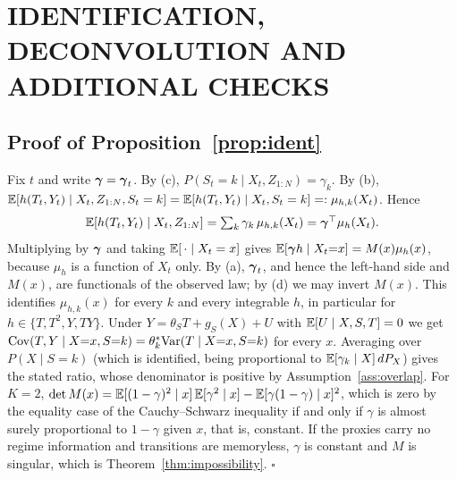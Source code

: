 \section{IDENTIFICATION, DECONVOLUTION AND ADDITIONAL CHECKS}
\label{app:ident}

\subsection{Proof of Proposition~\ref{prop:ident}}
Fix $t$ and write $\boldsymbol{\gamma}=\boldsymbol{\gamma}_t$. By (c), $P(S_t=k\mid X_t,Z_{1:N})=\gamma_k$. By (b), $\mathbb{E}[h(T_t,Y_t)\mid X_t,Z_{1:N},S_t=k]=\mathbb{E}[h(T_t,Y_t)\mid X_t,S_t=k]=:\mu_{h,k}(X_t)$. Hence
\[
\mathbb{E}[h(T_t,Y_t)\mid X_t,Z_{1:N}]=\textstyle\sum_k\gamma_k\,\mu_{h,k}(X_t)=\boldsymbol{\gamma}^\top\mu_h(X_t).
\]
Multiplying by $\boldsymbol{\gamma}$ and taking $\mathbb{E}[\,\cdot\mid X_t=x]$ gives $\mathbb{E}[\boldsymbol{\gamma} h\mid X_t{=}x]=M(x)\mu_h(x)$, because $\mu_h$ is a function of $X_t$ only. By (a), $\boldsymbol{\gamma}_t$, and hence the left-hand side and $M(x)$, are functionals of the observed law; by (d) we may invert $M(x)$. This identifies $\mu_{h,k}(x)$ for every $k$ and every integrable $h$, in particular for $h\in\{T,T^2,Y,TY\}$. Under $Y=\theta_ST+g_S(X)+U$ with $\mathbb{E}[U\mid X,S,T]=0$ we get $\mathrm{Cov}(T,Y\mid X{=}x,S{=}k)=\theta_k^*\mathrm{Var}(T\mid X{=}x,S{=}k)$ for every $x$. Averaging over $P(X\mid S{=}k)$ (which is identified, being proportional to $\mathbb{E}[\gamma_k\mid X]\,dP_X$) gives the stated ratio, whose denominator is positive by Assumption~\ref{ass:overlap}. For $K=2$, $\det M(x)=\mathbb{E}[(1-\gamma)^2\mid x]\,\mathbb{E}[\gamma^2\mid x]-\mathbb{E}[\gamma(1-\gamma)\mid x]^2$, which is zero by the equality case of the Cauchy--Schwarz inequality if and only if $\gamma$ is almost surely proportional to $1-\gamma$ given $x$, that is, constant. If the proxies carry no regime information and transitions are memoryless, $\gamma$ is constant and $M$ is singular, which is Theorem~\ref{thm:impossibility}. $\square$

